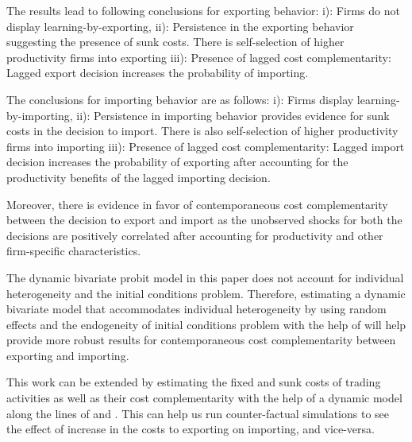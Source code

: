 \documentclass[12pt]{article}
\begin{document}
The results lead to following conclusions for exporting behavior:
i): Firms do not display learning-by-exporting,
ii): Persistence in the exporting behavior suggesting the presence of
sunk costs.  There is 
  self-selection of higher productivity firms into
   exporting  
iii):  Presence of lagged cost complementarity: Lagged export
decision increases the probability of importing.

The conclusions for importing behavior are as follows:
i): Firms  display learning-by-importing,
ii): Persistence in importing behavior provides evidence for
sunk costs in the decision to import. There is also self-selection of higher productivity firms into
   importing
iii):  Presence of lagged cost complementarity: Lagged import decision
increases the probability of exporting after accounting for the
productivity benefits of the lagged importing decision. 

Moreover, there is evidence in favor of contemporaneous cost complementarity between the
decision to export and import as  the unobserved shocks for both the
decisions are positively
correlated after accounting for productivity and other firm-specific
characteristics. 


The dynamic bivariate probit model in this paper does not account for
individual heterogeneity and the initial conditions
problem. Therefore, estimating a dynamic bivariate model that
accommodates individual heterogeneity by using random effects and the
endogeneity of initial conditions problem with the help of
\textcite{wooldridge2005simple} will help provide more robust
results for contemporaneous cost complementarity between exporting and
importing. 

This work can be extended by estimating the fixed and sunk
costs of trading activities as well as their cost
complementarity with the help of a dynamic model along the lines of
\textcite{kasahara2013productivity} and \textcite{aw2011}. This can
help us run  counter-factual 
simulations to see the effect of increase in the
costs to exporting on importing, and vice-versa.  
\end{document}
